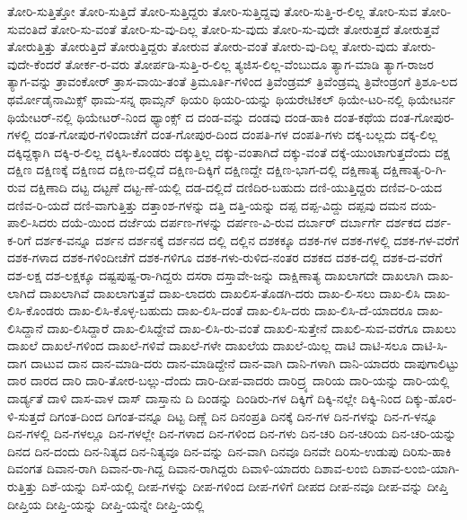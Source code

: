 {ತೋರಿ-ಸುತ್ತಿತ್ತೋ
ತೋರಿ-ಸುತ್ತಿದೆ
ತೋರಿ-ಸುತ್ತಿದ್ದರು
ತೋರಿ-ಸುತ್ತಿದ್ದವು
ತೋರಿ-ಸುತ್ತಿ-ರ-ಲಿಲ್ಲ
ತೋರಿ-ಸುವ
ತೋರಿ-ಸುವಂತಿದೆ
ತೋರಿ-ಸು-ವಂತೆ
ತೋರಿ-ಸು-ವು-ದಿಲ್ಲ
ತೋರಿ-ಸು-ವುದು
ತೋರಿ-ಸು-ವುದೇ
ತೋರುತ್ತದೆ
ತೋರುತ್ತವೆ
ತೋರುತ್ತಿತ್ತು
ತೋರುತ್ತಿದೆ
ತೋರುತ್ತಿದ್ದರು
ತೋರುವ
ತೋರು-ವಂತೆ
ತೋರು-ವು-ದಿಲ್ಲ
ತೋರು-ವುದು
ತೋರು-ವುದೇ-ಕೆಂದರೆ
ತೋರ್ಕ-ರ-ವರು
ತೋರ್ಪಡಿ-ಸುತ್ತಿ-ರ-ಲಿಲ್ಲ
ತ್ಯಜಿಸ-ಲಿಲ್ಲ-ವೆಂಬುದೂ
ತ್ಯಾಗ-ಮಾಡಿ
ತ್ಯಾಗ-ರಾಜರ
ತ್ಯಾಗ-ವನ್ನು
ತ್ರಾವಂಕೋರ್
ತ್ರಾಸ-ವಾಯಿ-ತಂತೆ
ತ್ರಿಮೂರ್ತಿ-ಗಳಿಂದ
ತ್ರಿವೆಂಡ್ರಮ್
ತ್ರಿವೆಂಡ್ರಮ್ನ
ತ್ರಿವೇಂಡ್ರಂಗೆ
ತ್ರಿಶೂ-ಲದ
ಥರ್ಮೋಡೈನಾಮಿಕ್ಸ್
ಥಾಮ-ಸನ್ನ
ಥಾಮ್ಸನ್
ಥಿಯರಿ
ಥಿಯರಿ-ಯನ್ನು
ಥಿಯರೇಟಿಕಲ್
ಥಿಯೇ-ಟರಿ-ನಲ್ಲಿ
ಥಿಯೇಟರ್ನ
ಥಿಯೇಟರ್-ನಲ್ಲಿ
ಥಿಯೇಟರ್-ನಿಂದ
ಥ್ಯಾಂಕ್ಸ್
ದ
ದಂಡ-ವನ್ನು
ದಂಡವು
ದಂಡ-ಹಾಕಿ
ದಂತ-ಕಥೆಯ
ದಂತ-ಗೋಪುರ-ಗಳಲ್ಲಿ
ದಂತ-ಗೋಪುರ-ಗಳಿಂದಾಚೆಗೆ
ದಂತ-ಗೋಪುರ-ದಿಂದ
ದಂಪತಿ-ಗಳ
ದಂಪತಿ-ಗಳು
ದಕ್ಕ-ಬಲ್ಲದು
ದಕ್ಕ-ಲಿಲ್ಲ
ದಕ್ಕಿದ್ದಕ್ಕಾಗಿ
ದಕ್ಕಿ-ರ-ಲಿಲ್ಲ
ದಕ್ಕಿಸಿ-ಕೊಂಡರು
ದಕ್ಕುತ್ತಿಲ್ಲ
ದಕ್ಕು-ವಂತಾಗಿದೆ
ದಕ್ಕು-ವಂತೆ
ದಕ್ಕೆ-ಯುಂಟಾಗುತ್ತದೆಂದು
ದಕ್ಷ
ದಕ್ಷಿಣ
ದಕ್ಷಿಣಕ್ಕೆ
ದಕ್ಷಿಣದ
ದಕ್ಷಿಣ-ದಲ್ಲಿದೆ
ದಕ್ಷಿಣ-ದಿಕ್ಕಿಗೆ
ದಕ್ಷಿಣದ್ದೇ
ದಕ್ಷಿಣ-ಭಾಗ-ದಲ್ಲಿ
ದಕ್ಷಿಣಾತ್ಯ
ದಕ್ಷಿಣಾತ್ಯ-ರಿ-ಗಿ-ರುವ
ದಕ್ಷಿಣಾದಿ
ದಟ್ಟ
ದಟ್ಟಣೆ
ದಟ್ಟ-ಣೆ-ಯಲ್ಲಿ
ದಡ-ದಲ್ಲಿದೆ
ದಣಿದಿರ-ಬಹುದು
ದಣಿ-ಯುತ್ತಿದ್ದರು
ದಣಿವ-ರಿ-ಯದ
ದಣಿವ-ರಿ-ಯದೆ
ದಣಿ-ವಾಗುತ್ತಿತ್ತು
ದತ್ತಾಂಶ-ಗಳನ್ನು
ದತ್ತಿ
ದತ್ತಿ-ಯನ್ನು
ದಪ್ಪ
ದಪ್ಪ-ವಿದ್ದು
ದಪ್ಪವು
ದಮನ
ದಯ-ಪಾಲಿ-ಸಿದರು
ದಯೆ-ಯಿಂದ
ದರ್ಜೆಯ
ದರ್ಪಣ-ಗಳನ್ನು
ದರ್ಪಣ-ವಿ-ರುವ
ದರ್ಬಾರ್
ದರ್ಬಾರ್ಗೆ
ದರ್ಶಕದ
ದರ್ಶ-ಕ-ರಿಗೆ
ದರ್ಶಕ-ವನ್ನೂ
ದರ್ಶನ
ದರ್ಶನಕ್ಕೆ
ದರ್ಶನದ
ದಲ್ಲಿ
ದಲ್ಲಿನ
ದಶಕಕ್ಕೂ
ದಶಕ-ಗಳ
ದಶಕ-ಗಳಲ್ಲಿ
ದಶಕ-ಗಳ-ವರೆಗೆ
ದಶಕ-ಗಳಾದ
ದಶಕ-ಗಳಿಂದೀಚೆಗೆ
ದಶಕ-ಗಳಿಗೂ
ದಶಕ-ಗಳು-ರುಳಿದ-ನಂತರ
ದಶಕದ
ದಶಕ-ದಲ್ಲಿ
ದಶಕ-ದ-ವರೆಗೆ
ದಶ-ಲಕ್ಷ
ದಶ-ಲಕ್ಷಕ್ಕೂ
ದಷ್ಟಪುಷ್ಟ-ರಾ-ಗಿದ್ದರು
ದಸರಾ
ದಸ್ತಾವೇ-ಜನ್ನು
ದಾಕ್ಷಿಣಾತ್ಯ
ದಾಖಲಾಗದೇ
ದಾಖಲಾಗಿ
ದಾಖ-ಲಾಗಿದೆ
ದಾಖಲಾಗಿವೆ
ದಾಖಲಾಗುತ್ತವೆ
ದಾಖ-ಲಾದರು
ದಾಖಲಿಸ-ತೊಡಗಿ-ದರು
ದಾಖ-ಲಿ-ಸಲು
ದಾಖ-ಲಿಸಿ
ದಾಖ-ಲಿಸಿ-ಕೊಂಡರು
ದಾಖ-ಲಿಸಿ-ಕೊಳ್ಳ-ಬಹುದು
ದಾಖ-ಲಿಸಿ-ದಂತೆ
ದಾಖ-ಲಿಸಿ-ದರು
ದಾಖ-ಲಿಸಿ-ದೆ-ಯಾದರೂ
ದಾಖ-ಲಿಸಿದ್ದಾನೆ
ದಾಖ-ಲಿಸಿದ್ದಾರೆ
ದಾಖ-ಲಿಸಿದ್ದೇವೆ
ದಾಖ-ಲಿಸಿ-ರು-ವಂತೆ
ದಾಖಲಿ-ಸುತ್ತೇನೆ
ದಾಖಲಿ-ಸುವ-ವರೆಗೂ
ದಾಖಲು
ದಾಖಲೆ
ದಾಖಲೆ-ಗಳಿಂದ
ದಾಖಲೆ-ಗಳಿವೆ
ದಾಖಲೆ-ಗಳೇ
ದಾಖಲೆಯ
ದಾಖಲೆ-ಯಿಲ್ಲ
ದಾಟಿ
ದಾಟಿ-ಸಲೂ
ದಾಟಿ-ಸಿ-ದಾಗ
ದಾಟುವ
ದಾನ
ದಾನ-ಮಾಡಿ-ದರು
ದಾನ-ಮಾಡಿದ್ದೇನೆ
ದಾನ-ವಾಗಿ
ದಾನಿ-ಗಳಾಗಿ
ದಾನಿ-ಯಾದರು
ದಾಪುಗಾಲಿಟ್ಟು
ದಾರ
ದಾರದ
ದಾರಿ
ದಾರಿ-ತೋರ-ಬಲ್ಲು-ದೆಂದು
ದಾರಿ-ದೀಪ-ವಾದರು
ದಾರಿದ್ರ್ಯ
ದಾರಿಯ
ದಾರಿ-ಯನ್ನು
ದಾರಿ-ಯಲ್ಲಿ
ದಾರ್ಡ್ಯತೆ
ದಾಳಿ
ದಾಸ-ವಾಳ
ದಾಸ್
ದಾಸ್ತಾನು
ದಿ
ದಿಂಡನ್ನು
ದಿಂಡಿರು-ಗಳ
ದಿಕ್ಕಿಗೆ
ದಿಕ್ಕಿ-ನಲ್ಲೇ
ದಿಕ್ಕಿ-ನಿಂದ
ದಿಕ್ಕು-ಹೊರ-ಳಿ-ಸುತ್ತದೆ
ದಿಗಂತ-ದಿಂದ
ದಿಗಂತ-ವನ್ನೂ
ದಿಟ್ಟ
ದಿಣ್ಣೆ
ದಿನ
ದಿನಂಪ್ರತಿ
ದಿನಕ್ಕೆ
ದಿನ-ಗಳ
ದಿನ-ಗಳನ್ನು
ದಿನ-ಗ-ಳನ್ನೂ
ದಿನ-ಗಳಲ್ಲಿ
ದಿನ-ಗಳಲ್ಲೂ
ದಿನ-ಗಳಲ್ಲೇ
ದಿನ-ಗಳಾದ
ದಿನ-ಗಳಿಂದ
ದಿನ-ಗಳು
ದಿನ-ಚರಿ
ದಿನ-ಚರಿಯ
ದಿನ-ಚರಿ-ಯನ್ನು
ದಿನದ
ದಿನ-ದಂದು
ದಿನ-ನಿತ್ಯದ
ದಿನ-ನಿತ್ಯವೂ
ದಿನ-ವನ್ನು
ದಿನ-ವಾಗಿ
ದಿನವೂ
ದಿನವೇ
ದಿರಿಸು-ಉಡುಪು
ದಿರಿಸು-ಹಾಕಿ
ದಿವಂಗತ
ದಿವಾನ-ರಾಗಿ
ದಿವಾನ-ರಾ-ಗಿದ್ದ
ದಿವಾನ-ರಾಗಿದ್ದರು
ದಿವಾಳಿ-ಯಾದರು
ದಿಶಾವ-ಲಂಬಿ
ದಿಶಾವ-ಲಂಬಿ-ಯಾಗಿ-ರುತ್ತಿತ್ತು
ದಿಶೆ-ಯನ್ನು
ದಿಸೆ-ಯಲ್ಲಿ
ದೀಪ-ಗಳನ್ನು
ದೀಪ-ಗಳಿಂದ
ದೀಪ-ಗಳಿಗೆ
ದೀಪದ
ದೀಪ-ನವೂ
ದೀಪ-ವನ್ನು
ದೀಪ್ತಿ
ದೀಪ್ತಿಯ
ದೀಪ್ತಿ-ಯನ್ನು
ದೀಪ್ತಿ-ಯನ್ನೇ
ದೀಪ್ತಿ-ಯಲ್ಲಿ
}
